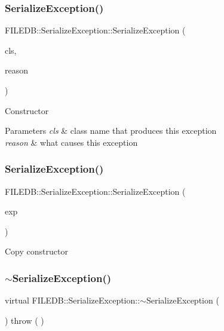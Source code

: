 \subsubsection{\texorpdfstring{SerializeException()}{SerializeException()}\hspace{0.1cm}{\footnotesize\ttfamily [4/9]}}
{\footnotesize\ttfamily F\+I\+L\+E\+D\+B\+::\+Serialize\+Exception\+::\+Serialize\+Exception (\begin{DoxyParamCaption}\item[{const std\+::string \&}]{cls,  }\item[{const std\+::string \&}]{reason }\end{DoxyParamCaption})}

Constructor 
\begin{DoxyParams}{Parameters}
{\em cls} & class name that produces this exception \\
\hline
{\em reason} & what causes this exception \\
\hline
\end{DoxyParams}
\mbox{\label{classFILEDB_1_1SerializeException_a4583fae246a4b2d2f468c3a4ec0ecb08}} 
\subsubsection{\texorpdfstring{SerializeException()}{SerializeException()}\hspace{0.1cm}{\footnotesize\ttfamily [5/9]}}
{\footnotesize\ttfamily F\+I\+L\+E\+D\+B\+::\+Serialize\+Exception\+::\+Serialize\+Exception (\begin{DoxyParamCaption}\item[{const \mbox{\hyperlink{classFILEDB_1_1SerializeException}{Serialize\+Exception}} \&}]{exp }\end{DoxyParamCaption})}

Copy constructor \mbox{\label{classFILEDB_1_1SerializeException_ace236a2abdc486c44c695fbdc209923a}} 
\subsubsection{\texorpdfstring{$\sim$SerializeException()}{~SerializeException()}\hspace{0.1cm}{\footnotesize\ttfamily [2/3]}}
{\footnotesize\ttfamily virtual F\+I\+L\+E\+D\+B\+::\+Serialize\+Exception\+::$\sim$\+Serialize\+Exception (\begin{DoxyParamCaption}\item[{void}]{ }\end{DoxyParamCaption}) throw ( ) \hspace{0.3cm}{\ttfamily [virtual]}}

